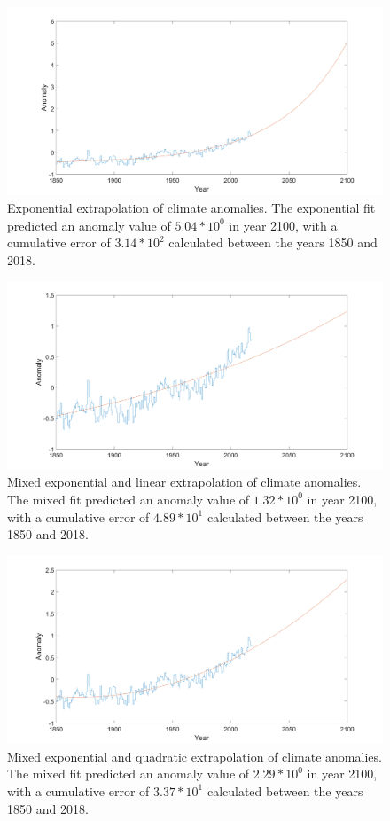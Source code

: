 \documentclass[11pt]{article}
\begin{document}
\begin{figure}[H]
    \centering
    \includegraphics[width=\textwidth]{exp.png}
    \caption{Exponential extrapolation of climate anomalies. The exponential fit predicted an anomaly value of $5.04*10^0 $ in year 2100, with a cumulative error of $3.14*10^2 $ calculated between the years 1850 and 2018.}
    \label{fig:exp}
\end{figure}

\begin{figure}[H]
    \centering
    \includegraphics[width=\textwidth]{mix1.png}
    \caption{ Mixed exponential and linear extrapolation of climate anomalies. The mixed fit predicted an anomaly value of $ 1.32*10^0$ in year 2100, with a cumulative error of $4.89*10^1 $ calculated between the years 1850 and 2018.}
    \label{fig:mix1}
\end{figure}

\begin{figure}[H]
    \centering
    \includegraphics[width=\textwidth]{mix2.png}
    \caption{Mixed exponential and quadratic extrapolation of climate anomalies. The mixed fit predicted an anomaly value of $ 2.29*10^0$ in year 2100, with a cumulative error of $ 3.37*10^1$ calculated between the years 1850 and 2018.}
    \label{fig:mix2}
\end{figure}
\end{document}
